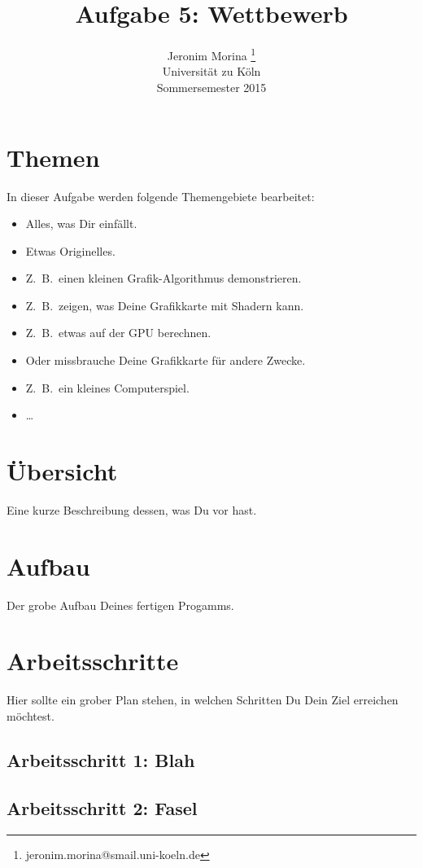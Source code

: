 \documentclass[10pt]{article}
\title{Aufgabe 5: Wettbewerb}
\author{Jeronim Morina \thanks{jeronim.morina@smail.uni-koeln.de}\\
        \scriptsize Universität zu Köln\\
        Sommersemester 2015
}
\begin{document}
\maketitle

\begin{multicols}{2}

\section{Themen}
In dieser Aufgabe werden folgende Themengebiete bearbeitet:
\begin{itemize}
\item Alles, was Dir einfällt.
\item Etwas Originelles.
\item Z.~B.\ einen kleinen Grafik-Algorithmus demonstrieren.
\item Z.~B.\ zeigen, was Deine Grafikkarte mit Shadern kann.
\item Z.~B.\ etwas auf der GPU berechnen.
\item Oder missbrauche Deine Grafikkarte für andere Zwecke.
\item Z.~B.\ ein kleines Computerspiel.
\item \dots
\end{itemize}


\section{Übersicht}

Eine kurze Beschreibung dessen, was Du vor hast.

\section{Aufbau}

Der grobe Aufbau Deines fertigen Progamms.

\section{Arbeitsschritte}
Hier sollte ein grober Plan stehen, in welchen Schritten Du Dein Ziel
erreichen möchtest.
\subsection{Arbeitsschritt 1: Blah}
\subsection{Arbeitsschritt 2: Fasel}


\end{multicols}
\end{document}

